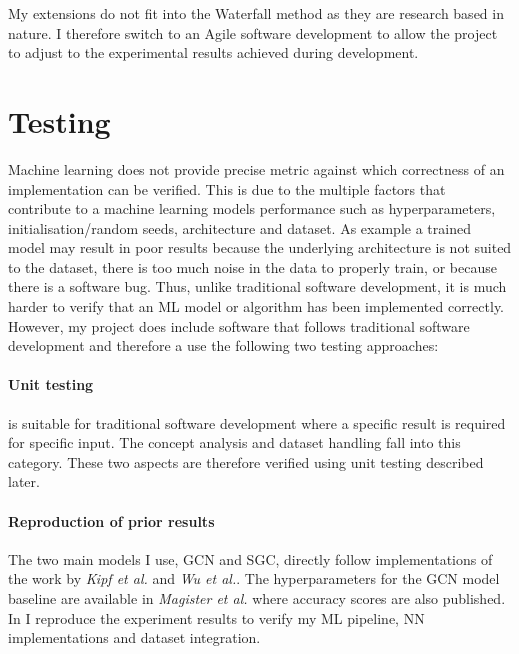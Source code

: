 My extensions do not fit into the Waterfall method as they are research based in nature. I therefore switch to an Agile software development  to allow the project to adjust to the experimental results achieved during development.

\section{Testing}


Machine learning does not provide precise metric against which correctness of an implementation can be verified.
This is due to the multiple factors that contribute to a machine learning models performance such as hyperparameters, initialisation/random seeds, architecture and dataset.
As example a trained model may result in poor results because the underlying architecture is not suited to the dataset, there is too much noise in the data to properly train, or because there is a software bug.
Thus, unlike traditional software development, it is much harder to verify that an ML model or algorithm has been implemented correctly.
However, my project does include software that follows traditional software development and therefore a use the following two testing approaches:

\paragraph{Unit testing}
is suitable for traditional software development where a specific result is required for specific input.
The concept analysis and dataset handling fall into this category.
These two aspects are therefore verified using unit testing described later. 

\paragraph{Reproduction of prior results}
The two main models I use, GCN and SGC, directly follow implementations of the work by \textit{Kipf et al.}\cite{kipf2016semi} and \textit{Wu et al.}\cite{wu2019simplifying}.
The hyperparameters for the GCN model baseline are available in \textit{Magister et al.}\cite{magister2021gcexplainer} where accuracy scores are also published.
In  I reproduce the experiment results to verify my ML pipeline, NN implementations and dataset integration.

